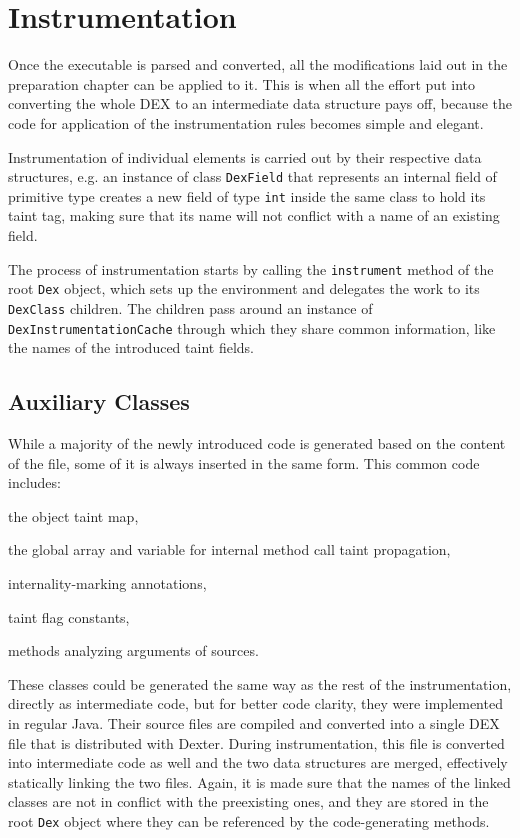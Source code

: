 \documentclass[12pt,twoside,notitlepage]{report}
\begin{document}
\section{Instrumentation}

Once the executable is parsed and converted, all the modifications laid out in the preparation chapter can be applied to it. This is when all the effort put into converting the whole DEX to an intermediate data structure pays off, because the code for application of the instrumentation rules becomes simple and elegant. 

Instrumentation of individual elements is carried out by their respective data structures, e.g. an instance of class \verb$DexField$ that represents an internal field of primitive type creates a new field of type \verb$int$ inside the same class to hold its taint tag, making sure that its name will not conflict with a name of an existing field. 

The process of instrumentation starts by calling the \verb$instrument$ method of the root \verb$Dex$ object, which sets up the environment and delegates the work to its \verb$DexClass$ children. The children pass around an instance of \verb$DexInstrumentationCache$ through which they share common information, like the names of the introduced taint fields.

\subsection{Auxiliary Classes}

While a majority of the newly introduced code is generated based on the content of the file, some of it is always inserted in the same form. This common code includes:
\begin{inparaenum}[(i)]
\item the object taint map,
\item the global array and variable for internal method call taint propagation,
\item internality-marking annotations,
\item taint flag constants,
\item methods analyzing arguments of sources.
\end{inparaenum}

These classes could be generated the same way as the rest of the instrumentation, directly as intermediate code, but for better code clarity, they were implemented in regular Java. Their source files are compiled and converted into a single DEX file that is distributed with Dexter. During instrumentation, this file is converted into intermediate code as well and the two data structures are merged, effectively statically linking the two files. Again, it is made sure that the names of the linked classes are not in conflict with the preexisting ones, and they are stored in the root \verb$Dex$ object where they can be referenced by the code-generating methods.
\end{document}
